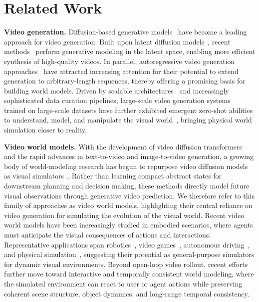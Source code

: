 \section{Related Work}

\noindent\textbf{Video generation.}
Diffusion-based generative models~\cite{ho2020denoising, lipman2022flow, song2020score} have become a leading approach for video generation.
Built upon latent diffusion models~\cite{rombach2022high}, recent methods~\cite{chen2024videocrafter2, guo2023animatediff, yang2024cogvideox} perform generative modeling in the latent space, enabling more efficient synthesis of high-quality videos.
In parallel, autoregressive video generation approaches~\cite{chen2024diffusion, henschel2025streamingt2v, kim2024fifo} have attracted increasing attention for their potential to extend generation to arbitrary-length sequences, thereby offering a promising basis for building world models.
Driven by scalable architectures~\cite{peebles2023scalable} and increasingly sophisticated data curation pipelines, large-scale video generation systems~\cite{veo, sora, wan, kling, gao2025seedance, kong2024hunyuanvideo} trained on large-scale datasets have further exhibited emergent zero-shot abilities to understand, model, and manipulate the visual world~\cite{wiedemer2025video}, bringing physical world simulation closer to reality.

\noindent\textbf{Video world models.}
With the development of video diffusion transformers and the rapid advances in text-to-video and image-to-video generation, a growing body of world-modeling research has begun to repurpose video diffusion models as visual simulators~\cite{yang2023unisim,bar2025navigation,liang2024dreamitate}.
Rather than learning compact abstract states for downstream planning and decision making, these methods directly model future visual observations through generative video prediction.
We therefore refer to this family of approaches as video world models, highlighting their central reliance on video generation for simulating the evolution of the visual world.
Recent video world models have been increasingly studied in embodied scenarios, where agents must anticipate the visual consequences of actions and interactions.
Representative applications span robotics~\cite{mereu2025generative,yang2023learning,li2025unified,li2026causal,ye2026world,gao2026dreamdojo}, video games~\cite{alonso2024diffusion,he2025matrix,valevski2024diffusion,xiao2025worldmem, fan2022minedojo}, autonomous driving~\cite{agarwal2025cosmos,hu2023gaia}, and physical simulation~\cite{li2025pisa,yuan2026inference}, suggesting their potential as general-purpose simulators for dynamic visual environments.
Beyond open-loop video rollout, recent efforts~\cite{hyworld2025,worldplay2025,yu2025cam} further move toward interactive and temporally consistent world modeling, where the simulated environment can react to user or agent actions while preserving coherent scene structure, object dynamics, and long-range temporal consistency.

